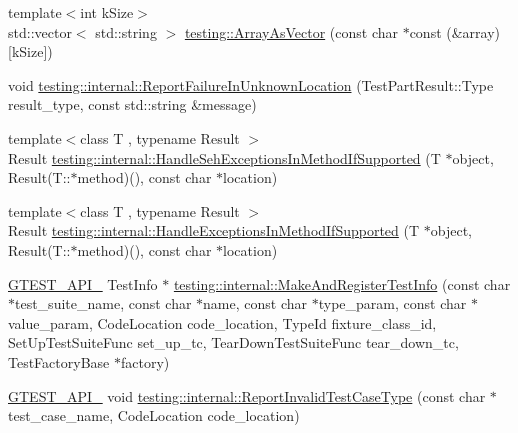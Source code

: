 \begin{DoxyCompactItemize}
\item 
{\footnotesize template$<$int k\+Size$>$ }\\std\+::vector$<$ std\+::string $>$ \mbox{\hyperlink{namespacetesting_ab25cc403881367e4ae289dab4eb37f5d}{testing\+::\+Array\+As\+Vector}} (const char $\ast$const (\&array)\mbox{[}k\+Size\mbox{]})
\item 
void \mbox{\hyperlink{namespacetesting_1_1internal_a85f6ff0e40f9a5f10af66a73cf1364fa}{testing\+::internal\+::\+Report\+Failure\+In\+Unknown\+Location}} (Test\+Part\+Result\+::\+Type result\+\_\+type, const std\+::string \&message)
\item 
{\footnotesize template$<$class T , typename Result $>$ }\\Result \mbox{\hyperlink{namespacetesting_1_1internal_ac5293b438139ef7ed05cb7fcaaf63545}{testing\+::internal\+::\+Handle\+Seh\+Exceptions\+In\+Method\+If\+Supported}} (T $\ast$object, Result(T\+::$\ast$method)(), const char $\ast$location)
\item 
{\footnotesize template$<$class T , typename Result $>$ }\\Result \mbox{\hyperlink{namespacetesting_1_1internal_addb2ed165b92b74e25fe9ebe9e46b9f9}{testing\+::internal\+::\+Handle\+Exceptions\+In\+Method\+If\+Supported}} (T $\ast$object, Result(T\+::$\ast$method)(), const char $\ast$location)
\item 
\mbox{\hyperlink{_obj__test_2lib_2googletest-release-1_88_81_2googletest_2include_2gtest_2internal_2gtest-port_8h_aa73be6f0ba4a7456180a94904ce17790}{G\+T\+E\+S\+T\+\_\+\+A\+P\+I\+\_\+}} Test\+Info $\ast$ \mbox{\hyperlink{namespacetesting_1_1internal_a82087d14f1d2e6b1930237a644658d3a}{testing\+::internal\+::\+Make\+And\+Register\+Test\+Info}} (const char $\ast$test\+\_\+suite\+\_\+name, const char $\ast$name, const char $\ast$type\+\_\+param, const char $\ast$value\+\_\+param, Code\+Location code\+\_\+location, Type\+Id fixture\+\_\+class\+\_\+id, Set\+Up\+Test\+Suite\+Func set\+\_\+up\+\_\+tc, Tear\+Down\+Test\+Suite\+Func tear\+\_\+down\+\_\+tc, Test\+Factory\+Base $\ast$factory)
\item 
\mbox{\hyperlink{_obj__test_2lib_2googletest-release-1_88_81_2googletest_2include_2gtest_2internal_2gtest-port_8h_aa73be6f0ba4a7456180a94904ce17790}{G\+T\+E\+S\+T\+\_\+\+A\+P\+I\+\_\+}} void \mbox{\hyperlink{namespacetesting_1_1internal_ab7e343160ee0aca7c8ae7c025a372453}{testing\+::internal\+::\+Report\+Invalid\+Test\+Case\+Type}} (const char $\ast$test\+\_\+case\+\_\+name, Code\+Location code\+\_\+location)
\item 

\end{DoxyCompactItemize}
